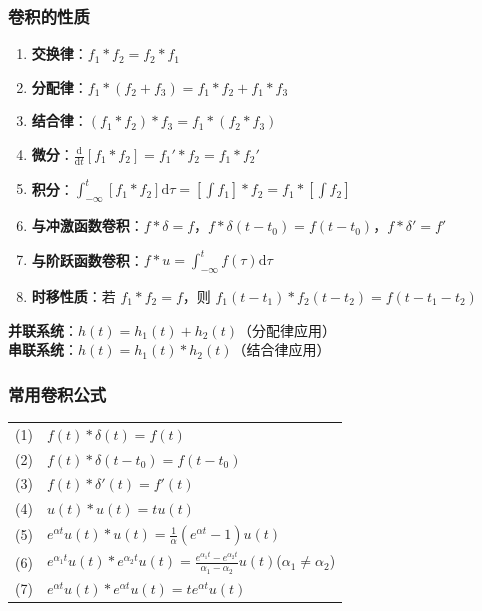 \documentclass[11pt,a4paper]{ctexart}
\newcommand{\dd}{\mathrm{d}}            %
\newcommand{\dirac}{\delta}             %
\begin{document}
\subsubsection{卷积的性质}
\begin{enumerate}
    \item \textbf{交换律}：$f_1 * f_2 = f_2 * f_1$
    \item \textbf{分配律}：$f_1 * (f_2 + f_3) = f_1 * f_2 + f_1 * f_3$
    \item \textbf{结合律}：$(f_1 * f_2) * f_3 = f_1 * (f_2 * f_3)$
    \item \textbf{微分}：$\frac{\dd}{\dd t}[f_1 * f_2] = f_1' * f_2 = f_1 * f_2'$
    \item \textbf{积分}：$\int_{-\infty}^{t}[f_1 * f_2]\dd\tau = [\int f_1] * f_2 = f_1 * [\int f_2]$
    \item \textbf{与冲激函数卷积}：$f * \dirac = f$，$f * \dirac(t - t_0) = f(t - t_0)$，$f * \dirac' = f'$
    \item \textbf{与阶跃函数卷积}：$f * u = \int_{-\infty}^{t} f(\tau)\dd\tau$
    \item \textbf{时移性质}：若 $f_1 * f_2 = f$，则 $f_1(t - t_1) * f_2(t - t_2) = f(t - t_1 - t_2)$
\end{enumerate}

\textbf{并联系统}：$h(t) = h_1(t) + h_2(t)$（分配律应用）\\
\textbf{串联系统}：$h(t) = h_1(t) * h_2(t)$（结合律应用）

\subsubsection{常用卷积公式}
\begin{tabular}{c|l}
\toprule
(1) & $f(t) * \dirac(t) = f(t)$ \\
(2) & $f(t) * \dirac(t - t_0) = f(t - t_0)$ \\
(3) & $f(t) * \dirac'(t) = f'(t)$ \\
(4) & $u(t) * u(t) = tu(t)$ \\
(5) & $e^{\alpha t}u(t) * u(t) = \frac{1}{\alpha}(e^{\alpha t} - 1)u(t)$ \\
(6) & $e^{\alpha_1 t}u(t) * e^{\alpha_2 t}u(t) = \frac{e^{\alpha_1 t} - e^{\alpha_2 t}}{\alpha_1 - \alpha_2}u(t)$\quad ($\alpha_1 \neq \alpha_2$) \\
(7) & $e^{\alpha t}u(t) * e^{\alpha t}u(t) = t e^{\alpha t}u(t)$ \\
\bottomrule
\end{tabular}
\end{document}
